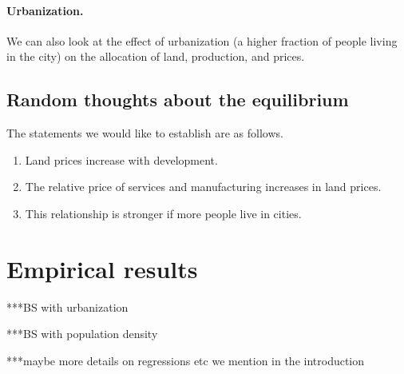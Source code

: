\documentclass[12pt]{article}
\begin{document}
\paragraph{Urbanization.} 
We can also look at the effect of urbanization (a higher fraction of people living in the city) on the allocation of land, production, and prices.

\subsection{Random thoughts about the equilibrium}
The statements we would like to establish are as follows.

\begin{enumerate}
  \item Land prices increase with development.
  \item The relative price of services and manufacturing increases in land prices.
  \item This relationship is stronger if more people live in cities.
\end{enumerate}

\section{Empirical results}
***BS with urbanization

***BS with population density

***maybe more details on regressions etc we mention in the introduction
\end{document}
